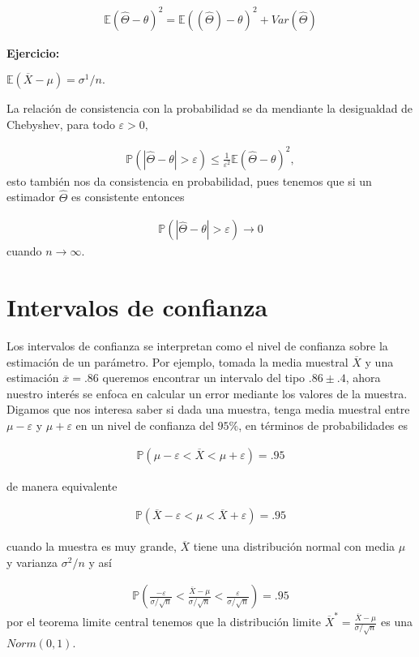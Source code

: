 \documentclass{article}
\newcommand{\Esp}{\mathbb{E}}
\newcommand{\Prb}{\mathbb{P}}
\begin{document}
\begin{align*}
     \Esp(\hat{\Theta}-\theta)^2 = \Esp((\hat{\Theta})-\theta)^2 +Var(\hat{\Theta})
\end{align*}

\textbf{Ejercicio:}

$\Esp(\overline{X}-\mu)=\sigma^1/n.$

La relación de consistencia con la probabilidad se da mendiante la desigualdad de Chebyshev, para todo $\varepsilon >0,$

\begin{align*}
    \Prb(|\hat{\Theta}- \theta| > \varepsilon) \leq \frac{1}{\varepsilon^2} \Esp (\hat{\Theta}-\theta)^2,
\end{align*}
esto también nos da consistencia en probabilidad, pues tenemos que si un estimador $\hat{\Theta}$ es consistente entonces

\begin{align*}
    \Prb(|\hat{\Theta}- \theta| > \varepsilon) \to 0
\end{align*}
cuando $n \to \infty.$

\section{Intervalos de confianza}
Los intervalos de confianza se interpretan como el nivel de confianza sobre la estimación de un parámetro. Por ejemplo, tomada la media muestral $\overline{X}$ y una estimación $\overline{x}=.86$ queremos encontrar un intervalo del tipo $.86 \pm .4$, ahora nuestro interés se enfoca en calcular un error mediante los valores de la muestra. Digamos que nos interesa saber si dada una muestra, tenga media muestral entre $\mu - \varepsilon$ y $\mu + \varepsilon$ en un nivel de confianza del $95\%$, en términos de probabilidades es 

\begin{align*}
   \Prb( \mu - \varepsilon < \overline{X} < \mu  +\varepsilon) = .95
\end{align*}

de manera equivalente

\begin{align*}
   \Prb( \overline{X} - \varepsilon < \mu < \overline{X} +\varepsilon) = .95
\end{align*}

cuando la muestra es muy grande, $\overline{X}$ tiene una distribución normal con media $\mu$ y varianza $\sigma^2/n$ y así 

\begin{align*}
   \Prb( \frac{- \varepsilon }{\sigma/\sqrt{n}} < \frac{\overline{X} - \mu }{\sigma/\sqrt{n}}  < \frac{\varepsilon }{\sigma/\sqrt{n}}) = .95
\end{align*}
por el teorema limite central tenemos que la distribución limite  $\overline{X}^*=\frac{\overline{X} - \mu }{\sigma/\sqrt{n}}$ es una $Norm(0,1)$. 
\end{document}

